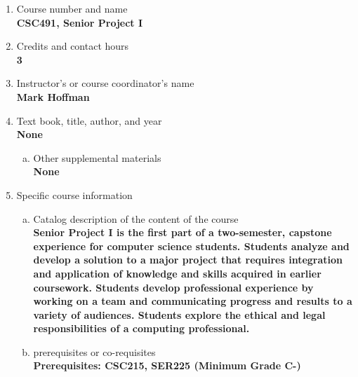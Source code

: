 \label{CSC491}  %
\begin{enumerate}[1.]
\item Course number and name\\
  {\bfseries
    CSC491, Senior Project I    
  }
  
\item Credits and contact hours\\
  {\bfseries
    3  %
  }

\item Instructor's or course coordinator's name\\
  {\bfseries
    Mark Hoffman    
  }

\item Text book, title, author, and year\\
  {\bfseries
    None    
  }
\begin{enumerate}[a.]
\item Other supplemental materials\\
  {\bfseries
    None    
  }
\end{enumerate}

\item Specific course information
\begin{enumerate}[a.]  
\item Catalog description of the content of the course\\
  {\bfseries
Senior Project I is the first part of a two-semester, capstone experience for computer science students. Students analyze and develop a solution to a major project that requires integration and application of knowledge and skills acquired in earlier coursework. Students develop professional experience by working on a team and communicating progress and results to a variety of audiences. Students explore the ethical and legal responsibilities of a computing professional.    
  }

\item prerequisites or co-requisites\\
  {\bfseries
    Prerequisites: CSC215, SER225 (Minimum Grade C-) \\  %
  }


\end{enumerate}
\end{enumerate}
